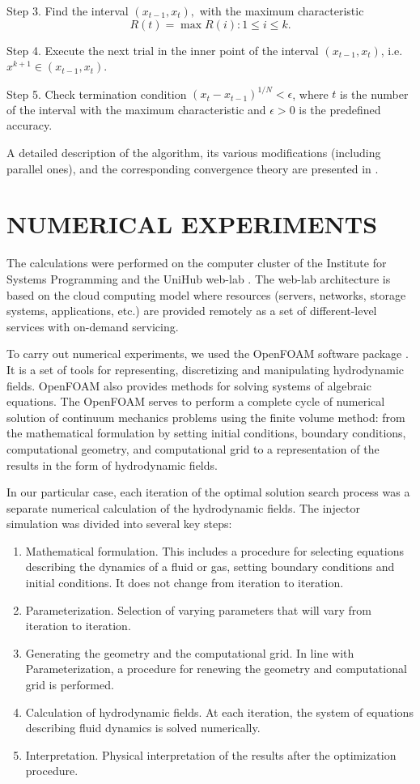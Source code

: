 \documentclass{aip-cp}
\begin{document}
Step 3. Find the interval $(x_{t-1},x_t),$ with the maximum characteristic 
\[
R(t)=\max{R(i):1 \leq i \leq k}.
\]

Step 4. Execute the next trial in the inner point of the interval  $(x_{t-1},x_t)$, i.e. $x^{k+1} \in (x_{t-1},x_t)$.

Step 5. Check termination condition  $\left(x_t-x_{t-1}\right)^{1/N}<\epsilon$, where $t$   is the number of the interval with the maximum characteristic and $\epsilon>0$ is the predefined accuracy.

A detailed description of the algorithm, its various modifications (including parallel ones), and the corresponding convergence  theory are presented in \cite{Strongin2000,Barkalov2010,Strongin2020}.
	

\section{NUMERICAL EXPERIMENTS}

The calculations were performed on the computer cluster of the Institute for Systems Programming and the UniHub web-lab \cite{UniHub}. The web-lab architecture is based on the cloud computing model where resources (servers, networks, storage systems, applications, etc.) are provided remotely as a set of different-level services with on-demand servicing.

To carry out numerical experiments, we used the OpenFOAM software package \cite{OpenFOAM}. It is a set of tools for representing, discretizing and manipulating hydrodynamic fields. OpenFOAM also provides methods for solving systems of algebraic equations. The OpenFOAM serves to perform a complete cycle of numerical solution of continuum mechanics problems using the finite volume method: from the mathematical formulation by setting initial conditions, boundary conditions, computational geometry, and computational grid to a representation of the results in the form of hydrodynamic fields.

In our particular case, each iteration of the optimal solution search process was a separate numerical calculation of the hydrodynamic fields. The injector simulation was divided into several key steps:
\begin{enumerate}
\item Mathematical formulation. This includes a procedure for selecting equations describing the dynamics of a fluid or gas, setting boundary conditions and initial conditions. It does not change from iteration to iteration.
\item Parameterization. Selection of varying parameters that will vary from iteration to iteration.
\item Generating the geometry and the computational grid. In line with Parameterization, a procedure for renewing the geometry and computational grid is performed.
\item Calculation of hydrodynamic fields. At each iteration, the system of equations describing fluid dynamics is solved numerically.
\item Interpretation. Physical interpretation of the results after the optimization procedure.
\end{enumerate}
\end{document}
